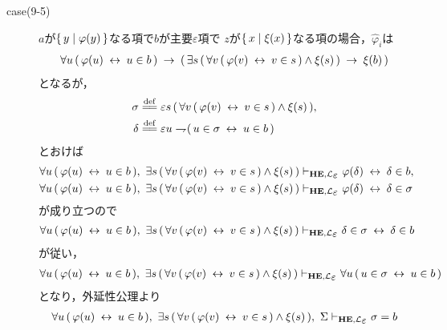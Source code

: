 \begin{metaprf}
\begin{description}
\begin{description}
					\item[case(9-5)] $a$が$\{\, y \mid \varphi(y)\, \}$なる項で$b$が主要$\varepsilon$項で
						$z$が$\{\, x \mid \xi(x)\, \}$なる項の場合，$\widehat{\varphi}_{i}$は
						\begin{align}
							\forall u\, (\, \varphi(u) \hspace{0.25em}\leftrightarrow\hspace{0.25em} u \in b\, ) 
							\hspace{0.25em}\rightarrow\hspace{0.25em} (\, \exists s\, (\, \forall v\, (\, \varphi(v) \hspace{0.25em}\leftrightarrow\hspace{0.25em} v \in s\, ) \wedge \xi(s)\, )
							\hspace{0.25em}\rightarrow\hspace{0.25em} \xi(b)\, )
						\end{align}
						となるが，
						\begin{align}
							\sigma &\defeq \varepsilon s\, (\, \forall v\, (\, \varphi(v) \lrarrow v \in s\, ) \wedge \xi(s)\, ), \\
							\delta &\defeq \varepsilon u \negation (\, u \in \sigma \lrarrow u \in b\, )
						\end{align}
						とおけば
						\begin{align}
							\forall u\, (\, \varphi(u) \lrarrow u \in b\, ),\ 
							\exists s\, (\, \forall v\, (\, \varphi(v) \lrarrow v \in s\, ) \wedge \xi(s)\, )
							&\provable{\mbox{{\bf HE}},\lang{\varepsilon}} \varphi(\delta) \lrarrow \delta \in b, \\
							\forall u\, (\, \varphi(u) \lrarrow u \in b\, ),\ 
							\exists s\, (\, \forall v\, (\, \varphi(v) \lrarrow v \in s\, ) \wedge \xi(s)\, )
							&\provable{\mbox{{\bf HE}},\lang{\varepsilon}} \varphi(\delta) \lrarrow \delta \in \sigma
						\end{align}
						が成り立つので
						\begin{align}
							\forall u\, (\, \varphi(u) \lrarrow u \in b\, ),\ 
							\exists s\, (\, \forall v\, (\, \varphi(v) \lrarrow v \in s\, ) \wedge \xi(s)\, )
							\provable{\mbox{{\bf HE}},\lang{\varepsilon}} \delta \in \sigma \lrarrow \delta \in b
						\end{align}
						が従い，
						\begin{align}
							\forall u\, (\, \varphi(u) \lrarrow u \in b\, ),\ 
							\exists s\, (\, \forall v\, (\, \varphi(v) \lrarrow v \in s\, ) \wedge \xi(s)\, )
							\provable{\mbox{{\bf HE}},\lang{\varepsilon}} \forall u\, (\, u \in \sigma \lrarrow u \in b\, )
						\end{align}
						となり，外延性公理より
						\begin{align}
							\forall u\, (\, \varphi(u) \lrarrow u \in b\, ),\ 
							\exists s\, (\, \forall v\, (\, \varphi(v) \lrarrow v \in s\, ) \wedge \xi(s)\, ),\ 
							\Sigma
							\provable{\mbox{{\bf HE}},\lang{\varepsilon}} \sigma = b

\end{align}
\end{description}
\end{description}
\end{metaprf}
